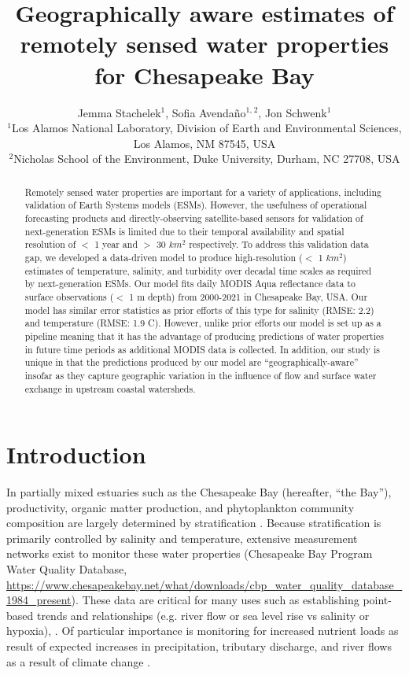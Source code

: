 \documentclass{article}
\title{Geographically aware estimates of remotely sensed water properties for Chesapeake Bay}
\author{Jemma Stachelek$^{1}$, Sofia Avendaño$^{1,}$$^{2}$, Jon Schwenk$^{1}$  \\
        \small $^{1}$Los Alamos National Laboratory, Division of Earth and Environmental Sciences, Los Alamos, NM 87545, USA \\
        \small $^{2}$Nicholas School of the Environment, Duke University, Durham, NC 27708, USA \\
}
\date{}
\begin{document}
\maketitle

\begin{abstract}
    \noindent Remotely sensed water properties are important for a variety of applications, including validation of Earth Systems models (ESMs). However, the usefulness of operational forecasting products and directly-observing satellite-based sensors for validation of next-generation ESMs is limited due to their temporal availability and spatial resolution of $<$ 1 year and $>$ 30 $km^2$ respectively. To address this validation data gap, we developed a data-driven model to produce high-resolution ($<$ 1 $km^2$) estimates of temperature, salinity, and turbidity over decadal time scales as required by next-generation ESMs. Our model fits daily MODIS Aqua reflectance data to surface observations ($<$ 1 m depth) from 2000-2021 in Chesapeake Bay, USA. Our model has similar error statistics as prior efforts of this type for salinity (RMSE: 2.2) and temperature (RMSE: 1.9 C). However, unlike prior efforts our model is set up as a pipeline meaning that it has the advantage of producing predictions of water properties in future time periods as additional MODIS data is collected. In addition, our study is unique in that the predictions produced by our model are “geographically-aware” insofar as they capture geographic variation in the influence of flow and surface water exchange in upstream coastal watersheds.
    \end{abstract} \hspace{10pt}

\linenumbers

\section{Introduction}

In partially mixed estuaries such as the Chesapeake Bay (hereafter, “the Bay”), productivity, organic matter production, and phytoplankton community composition are largely determined by stratification \citep{xuClimateForcingSalinity2012}. Because stratification is primarily controlled by salinity and temperature, extensive measurement networks exist to monitor these water properties (Chesapeake Bay Program Water Quality Database, \url{https://www.chesapeakebay.net/what/downloads/cbp_water_quality_database_1984_present}). These data are critical for many uses such as establishing point-based trends and relationships (e.g. river flow or sea level rise vs salinity or hypoxia), \citet{hagyHypoxiaChesapeakeBay2004}. Of particular importance is monitoring for increased nutrient loads as result of expected increases in precipitation, tributary discharge, and river flows as a result of climate change \citep{najjarPotentialClimatechangeImpacts2010, irbyCompetingImpactsClimate2018}.
\end{document}
